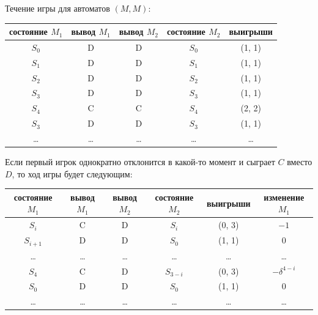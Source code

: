 \documentclass{article}
\theoremstyle{definition}
\theoremstyle{remark}
\begin{document}
Течение игры для автоматов $(M, M)$:
\begin{center}
	\begin{tabular}{|c|c|c|c|c|}
		\hline
		состояние $M_1$ & вывод $M_1$ & вывод $M_2$ & состояние $M_2$ & выигрыши\\
		\hline
		$S_0$ & D & D & $S_0$ & (1, 1)\\
		\hline
		$S_1$ & D & D & $S_1$ & (1, 1)\\
		\hline
		$S_2$ & D & D & $S_2$ & (1, 1)\\
		\hline
		$S_3$ & D & D & $S_3$ & (1, 1)\\
		\hline
		$S_4$ & C & C & $S_4$ & (2, 2)\\
		\hline
		$S_3$ & D & D & $S_3$ & (1, 1)\\
		\hline
		\ldots & \ldots & \ldots & \ldots & \ldots\\
		\hline
	\end{tabular}
\end{center}

Если первый игрок однократно отклонится в какой-то момент и сыграет $C$ вместо $D$, то ход игры
будет следующим:

\begin{center}
	\begin{tabular}{|c|c|c|c|c|c|}
		\hline
		состояние $M_1$ & вывод $M_1$ & вывод $M_2$ & состояние $M_2$ & выигрыши & изменение $M_1$ \\
		\hline
		$S_i$ & C & D & $S_i$ & (0, 3) & $-1$\\
		\hline
		$S_{i+1}$ & D & D & $S_0$ & (1, 1) & $0$\\
		\hline
		\ldots & \ldots & \ldots & \ldots & \ldots & \ldots \\
		\hline
		$S_{4}$ & C & D & $S_{3-i} $ & (0, 3) & $-\delta^{4-i}$\\
		\hline
		$S_{0}$ & D & D & $S_{0} $ & (1, 1) & $0$\\
		\hline
		\ldots & \ldots & \ldots & \ldots & \ldots & \ldots \\
		\hline
	\end{tabular}
\end{center}
\end{document}
